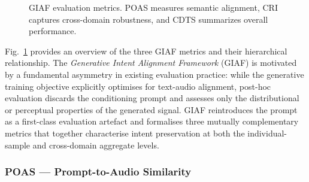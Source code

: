 \documentclass[journal]{IEEEtran}
\begin{document}
\begin{figure}[!t]
\centering
{}

\caption{GIAF evaluation metrics. POAS measures semantic alignment, CRI captures cross-domain robustness, and CDTS summarizes overall performance.}
\label{fig:giaf}
\end{figure}

Fig.~\ref{fig:giaf} provides an overview of the three GIAF metrics
and their hierarchical relationship. The \textit{Generative Intent
Alignment Framework} (GIAF) is motivated by a fundamental asymmetry
in existing evaluation practice: while the generative training objective
explicitly optimises for text-audio alignment, post-hoc evaluation
discards the conditioning prompt and assesses only the distributional
or perceptual properties of the generated signal. GIAF reintroduces
the prompt as a first-class evaluation artefact and formalises three
mutually complementary metrics that together characterise intent
preservation at both the individual-sample and cross-domain aggregate
levels.

\subsubsection{POAS --- Prompt-to-Audio Similarity}
\end{document}
